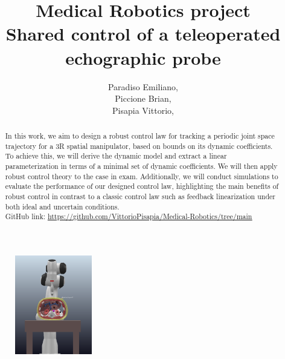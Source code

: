 \documentclass{article}
\author{Paradiso Emiliano,  \quad 1940454 \\Piccione Brian, \quad 1889051 \\Pisapia Vittorio,  \quad 1918590 }
\title{\Huge Medical Robotics project \\ \centering \Large \textbf{Shared control of a teleoperated echographic probe}}
\begin{document}
\date{}
\maketitle
\vspace{-1cm}

\begin{figure}[h]
    \centering
    \includegraphics[width=0.3\textwidth]{Approach.png}  
\end{figure}

\begin{abstract}
\hspace*{-0.5cm}In this work, we aim to design a robust control law for tracking a periodic joint space trajectory for a 3R spatial manipulator, based on bounds on its dynamic coefficients. To achieve this, we will derive the dynamic model and extract a linear parameterization in terms of a minimal set of dynamic coefficients. We will then apply robust control theory to the case in exam. Additionally, we will conduct simulations to evaluate the performance of our designed control law, highlighting the main benefits of robust control in contrast to a classic control law such as feedback linearization under both ideal and uncertain conditions.
\\GitHub link: \uline{\href{https://github.com/VittorioPisapia/Medical-Robotics/tree/main}{https://github.com/VittorioPisapia/Medical-Robotics/tree/main}}
\end{abstract}

\newpage
\tableofcontents
\newpage
\end{document}
